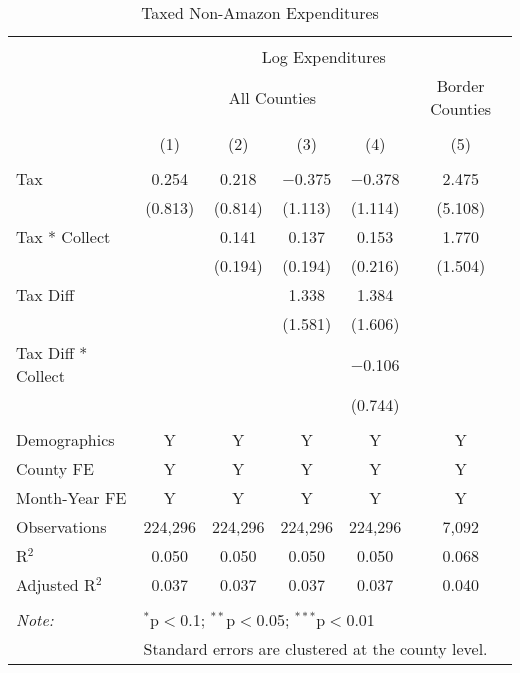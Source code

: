 
\begin{table}[!htbp] \centering 
  \caption{Taxed Non-Amazon Expenditures} 
  \label{} 
\begin{tabular}{@{\extracolsep{5pt}}lccccc} 
\\[-1.8ex]\hline 
\hline \\[-1.8ex] 
 & \multicolumn{5}{c}{Log Expenditures} \\ 
\cline{2-6} 
 & \multicolumn{4}{c}{All Counties} & Border Counties \\ 
\\[-1.8ex] & (1) & (2) & (3) & (4) & (5)\\ 
\hline \\[-1.8ex] 
 Tax & 0.254 & 0.218 & $-$0.375 & $-$0.378 & 2.475 \\ 
  & (0.813) & (0.814) & (1.113) & (1.114) & (5.108) \\ 
  Tax * Collect &  & 0.141 & 0.137 & 0.153 & 1.770 \\ 
  &  & (0.194) & (0.194) & (0.216) & (1.504) \\ 
  Tax Diff &  &  & 1.338 & 1.384 &  \\ 
  &  &  & (1.581) & (1.606) &  \\ 
  Tax Diff * Collect &  &  &  & $-$0.106 &  \\ 
  &  &  &  & (0.744) &  \\ 
 \hline \\[-1.8ex] 
Demographics & Y & Y & Y & Y & Y \\ 
County FE & Y & Y & Y & Y & Y \\ 
Month-Year FE & Y & Y & Y & Y & Y \\ 
Observations & 224,296 & 224,296 & 224,296 & 224,296 & 7,092 \\ 
R$^{2}$ & 0.050 & 0.050 & 0.050 & 0.050 & 0.068 \\ 
Adjusted R$^{2}$ & 0.037 & 0.037 & 0.037 & 0.037 & 0.040 \\ 
\hline 
\hline \\[-1.8ex] 
\textit{Note:}  & \multicolumn{5}{l}{$^{*}$p$<$0.1; $^{**}$p$<$0.05; $^{***}$p$<$0.01} \\ 
 & \multicolumn{5}{l}{Standard errors are clustered at the county level.} \\ 
\end{tabular} 
\end{table} 

